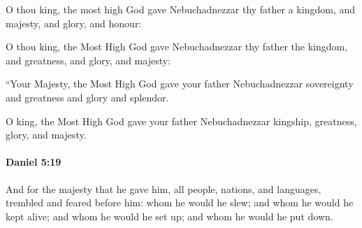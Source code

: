 			O thou king, the most high God gave Nebuchadnezzar thy father a kingdom, and majesty, and glory, and honour:

			\begin{versebox}
					\item[BHS] 
					\item[ASV] O thou king, the Most High God gave Nebuchadnezzar thy father the kingdom, and greatness, and glory, and majesty:
					\item[NIV] “Your Majesty, the Most High God gave your father Nebuchadnezzar sovereignty and greatness and glory and splendor.
					\item[NRSV] O king, the Most High God gave your father Nebuchadnezzar kingship, greatness, glory, and majesty.
			\end{versebox}

		\paragraph{Daniel 5:19} %
			\label{DANIEL-5-19}

			And for the majesty that he gave him, all people, nations, and languages, trembled and feared before him: whom he would he slew; and whom he would he kept alive; and whom he would he set up; and whom he would he put down.

